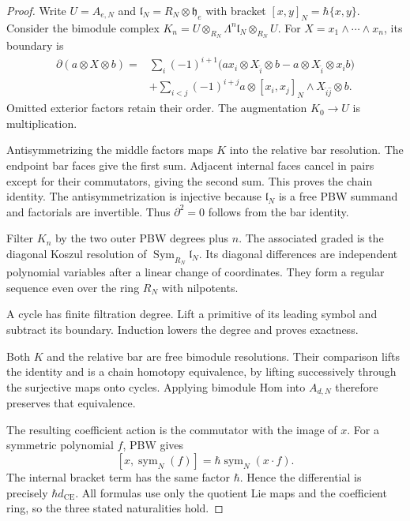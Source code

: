 \begin{proof}
Write $U=A_{e,N}$ and
$\mathfrak l_N=R_N\otimes\mathfrak h_e$ with bracket
$[x,y]_N=\hbar\{x,y\}$. Consider the bimodule complex
$K_n=U\otimes_{R_N}\Lambda^n\mathfrak l_N\otimes_{R_N}U$.
For $X=x_1\wedge\cdots\wedge x_n$, its boundary is
\begin{align*}
 \partial(a\otimes X\otimes b)
 ={}&\sum_i(-1)^{i+1}
 \bigl(ax_i\otimes X_{\widehat i}\otimes b
       -a\otimes X_{\widehat i}\otimes x_i b\bigr)\\
 &+\sum_{i<j}(-1)^{i+j}
 a\otimes[x_i,x_j]_N\wedge X_{\widehat i\widehat j}\otimes b.
\end{align*}
Omitted exterior factors retain their order. The augmentation
$K_0\to U$ is multiplication.

Antisymmetrizing the middle factors maps $K$ into the relative bar
resolution. The endpoint bar faces give the first sum.
Adjacent internal faces cancel in pairs except for their
commutators, giving the second sum. This proves the chain identity.
The antisymmetrization is injective because $\mathfrak l_N$ is a
free PBW summand and factorials are invertible.
Thus $\partial^2=0$ follows from the bar identity.

Filter $K_n$ by the two outer PBW degrees plus $n$.
The associated graded is the diagonal Koszul resolution of
$\operatorname{Sym}_{R_N}\mathfrak l_N$. Its diagonal differences
are independent polynomial variables after a linear change of
coordinates. They form a regular sequence even over the ring
$R_N$ with nilpotents.

A cycle has finite filtration degree.
Lift a primitive of its leading symbol and subtract its boundary.
Induction lowers the degree and proves exactness.

Both $K$ and the relative bar are free bimodule resolutions.
Their comparison lifts the identity and is a chain homotopy
equivalence, by lifting successively through the surjective maps
onto cycles. Applying bimodule Hom into $A_{d,N}$ therefore
preserves that equivalence.

The resulting coefficient action is the commutator with the image
of $x$. For a symmetric polynomial $f$, PBW gives
\[
 [x,\operatorname{sym}_N(f)]
      =\hbar\operatorname{sym}_N(x\cdot f).
\]
The internal bracket term has the same factor $\hbar$.
Hence the differential is precisely $\hbar d_{\mathrm{CE}}$.
All formulas use only the quotient Lie maps and the coefficient
ring, so the three stated naturalities hold.
\end{proof}

